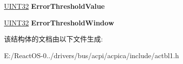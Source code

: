 \begin{DoxyCompactItemize}
\item 
\mbox{\label{structacpi__hest__notify_a96c95203a3575b151122176b306d34f0}} 
\hyperlink{_processor_bind_8h_ae1e6edbbc26d6fbc71a90190d0266018}{U\+I\+N\+T32} {\bfseries Error\+Threshold\+Value}
\item 
\mbox{\label{structacpi__hest__notify_a2410536c5d688b2c40217ca27879b1ba}} 
\hyperlink{_processor_bind_8h_ae1e6edbbc26d6fbc71a90190d0266018}{U\+I\+N\+T32} {\bfseries Error\+Threshold\+Window}
\end{DoxyCompactItemize}


该结构体的文档由以下文件生成\+:\begin{DoxyCompactItemize}
\item 
E\+:/\+React\+O\+S-\/0../drivers/bus/acpi/acpica/include/actbl1.\+h\end{DoxyCompactItemize}
